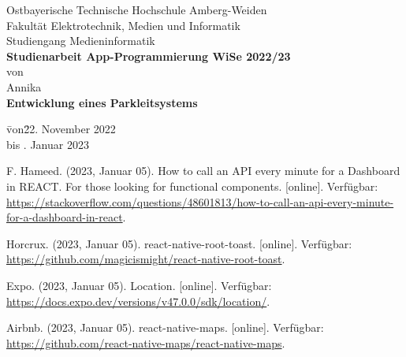 \documentclass[12pt,oneside]{report}
\newcommand*{\Sperren}[1]{\textls*[100]{#1}}
\newcommand*{\IhrVorname}{Annika}
\newcommand*{\IhrNachname}{Stadelmann}
\newcommand*{\IhrStudiengang}{Medieninformatik}
\newcommand*{\IhreArbeit}{Studienarbeit App-Programmierung WiSe 2022/23}
\newcommand*{\IhrTitelDE}{Entwicklung eines Parkleitsystems}
\newcommand*{\IhrBearbeitungszeitraumVON}{22. November 2022}
\newcommand*{\IhrBearbeitungszeitraumBIS}{17. Januar 2023}
\begin{document}
  \begin{titlepage}					
    \thispagestyle{empty}
    \begin{center}
      \Large
      Ostbayerische Technische Hochschule Amberg-Weiden\\
      Fakultät Elektrotechnik, Medien und Informatik\\[1cm]
      Studiengang \IhrStudiengang\\[1cm]
      \textbf{\IhreArbeit}\\[1cm]
      von\\[1cm]
      \IhrVorname\ \Sperren{\textbf{\IhrNachname}}\\[1cm]
      \textbf{\IhrTitelDE}\\[1cm]
    \end{center}
    \vspace*{11cm}
    \begin{tabbing}
      \qquad\= von\qquad\=\IhrBearbeitungszeitraumVON\\
                                        \> bis      \>\IhrBearbeitungszeitraumBIS
    \end{tabbing}
  \end{titlepage}
  
  \tableofcontents
  \newpage
  
  
  
  
  
 
  \begin{thebibliography}{10}
	 F. Hameed. (2023, Januar 05). How to call an API every minute for a Dashboard in REACT. For those looking for functional components. [online]. Verfügbar: \url{https://stackoverflow.com/questions/48601813/how-to-call-an-api-every-minute-for-a-dashboard-in-react}.
	
	 Horcrux. (2023, Januar 05). react-native-root-toast. [online]. Verfügbar: \url{https://github.com/magicismight/react-native-root-toast}.
	
	 Expo. (2023, Januar 05). Location. [online]. Verfügbar: \url{https://docs.expo.dev/versions/v47.0.0/sdk/location/}.
	
	 Airbnb. (2023, Januar 05). react-native-maps. [online]. Verfügbar: \url{https://github.com/react-native-maps/react-native-maps}.
  \end{thebibliography}
  \newpage
  
  \listoffigures
  \newpage
  
\end{document}
